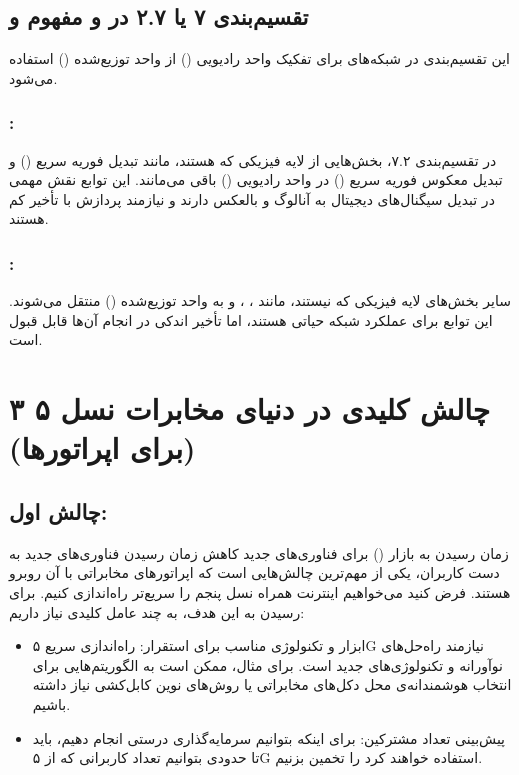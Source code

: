 \documentclass[landscape, 12pt]{report}
\begin{document}
\subsection*{تقسیم‌بندی ۷ یا ۲.۷ در  و مفهوم  و }
این تقسیم‌بندی در شبکه‌های  برای تفکیک واحد رادیویی () از واحد توزیع‌شده () استفاده می‌شود.

\subsubsection*{:}
در تقسیم‌بندی ۷.۲، بخش‌هایی از لایه فیزیکی که  هستند، مانند تبدیل فوریه سریع () و تبدیل معکوس فوریه سریع () در واحد رادیویی () باقی می‌مانند. این توابع نقش مهمی در تبدیل سیگنال‌های دیجیتال به آنالوگ و بالعکس دارند و نیازمند پردازش با تأخیر کم هستند.

\subsubsection*{:}
سایر بخش‌های لایه فیزیکی که  نیستند، مانند ، ،  و  به واحد توزیع‌شده () منتقل می‌شوند. این توابع برای عملکرد شبکه حیاتی هستند، اما تأخیر اندکی در انجام آن‌ها قابل قبول است.
\section*{
۳ چالش کلیدی در دنیای مخابرات نسل ۵ (برای اپراتورها)
}
\subsection*{چالش اول:}
 زمان رسیدن به بازار () برای فناوری‌های جدید
کاهش زمان رسیدن فناوری‌های جدید به دست کاربران، یکی از مهم‌ترین چالش‌هایی است که اپراتورهای مخابراتی با آن روبرو هستند. فرض کنید می‌خواهیم اینترنت همراه نسل پنجم  را سریع‌تر راه‌اندازی کنیم. برای رسیدن به این هدف، به چند عامل کلیدی نیاز داریم:
\begin{itemize}
\item ابزار و تکنولوژی مناسب برای استقرار: راه‌اندازی سریع ۵G نیازمند راه‌حل‌های نوآورانه و تکنولوژی‌های جدید است. برای مثال، ممکن است به الگوریتم‌هایی برای انتخاب هوشمندانه‌ی محل دکل‌های مخابراتی یا روش‌های نوین کابل‌کشی نیاز داشته باشیم.
\item پیش‌بینی تعداد مشترکین: برای اینکه بتوانیم سرمایه‌گذاری درستی انجام دهیم، باید تا حدودی بتوانیم تعداد کاربرانی که از ۵G استفاده خواهند کرد را تخمین بزنیم.
\end{itemize}
\end{document}

